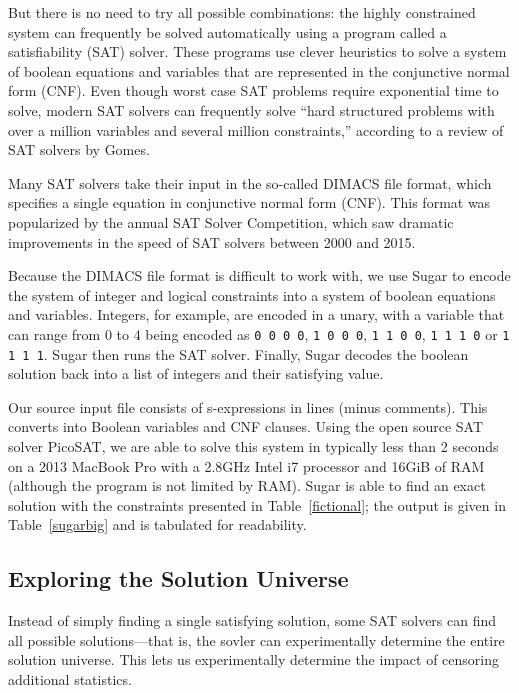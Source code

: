\documentclass[runningheads]{llncs}
\begin{document}
But there is no need to try all possible combinations: the highly
constrained system can frequently be solved automatically using a
program called a satisfiability (SAT) solver. These programs use
clever heuristics to solve a system of boolean equations and variables
that are represented in the conjunctive normal form (CNF). Even though worst case SAT
problems require exponential time to solve, modern SAT solvers can
frequently solve ``hard structured problems with over a million variables and
several million constraints,'' according to a review of SAT solvers by Gomes.\cite{Gomes200889} 

Many SAT solvers take their input in the so-called DIMACS file format,
which specifies a single equation in conjunctive normal form
(CNF). This format was popularized by the annual SAT Solver
Competition, which saw dramatic improvements in the speed of SAT
solvers between 2000 and 2015. 

Because the DIMACS file format is difficult to work with, we use Sugar
to encode the system of integer and logical constraints into a
system of boolean equations and variables. Integers, for example, are
encoded in a unary, with a variable that can range from 0 to 4 being
encoded as \Verb|0 0 0 0|, \Verb|1 0 0 0|, \Verb|1 1 0 0|,
\Verb|1 1 1 0| or \Verb|1 1 1 1|.  Sugar then runs the SAT
solver. Finally, Sugar decodes the boolean solution back into a list
of integers and their satisfying value. 

Our source input file consists of \NumSExpressions s-expressions in
\NumConstraintLines{} lines (minus comments).
This converts into
\NumVariables Boolean variables and \NumClauses CNF clauses. Using the
open source SAT solver PicoSAT\cite{Biere_picosatessentials}, we are able
to solve this system in typically less than 2 seconds on a 2013 MacBook Pro with a 2.8GHz Intel
i7 processor and 16GiB of RAM (although the program is not limited by
RAM). Sugar is able to find an exact solution with the constraints presented
in Table~\ref{fictional}; the output is given in Table~\ref{sugarbig} and is tabulated for readability.

\subsection{Exploring the Solution Universe}

Instead of simply finding a single satisfying solution, some SAT
solvers can find all possible solutions---that is, the sovler can
experimentally determine the entire solution universe. This lets us
experimentally determine the impact of censoring additional
statistics.
\end{document}
